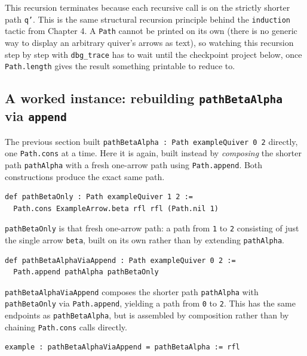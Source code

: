 This recursion terminates because each recursive call is on the strictly shorter path \texttt{q'}. This is the same structural recursion principle behind the \texttt{induction} tactic from Chapter 4. A \texttt{Path} cannot be printed on its own (there is no generic way to display an arbitrary quiver's arrows as text), so watching this recursion step by step with \texttt{dbg\_\allowbreak{}trace} has to wait until the checkpoint project below, once \texttt{Path.length} gives the result something printable to reduce to.

\subsection{\texorpdfstring{A worked instance: rebuilding \texttt{pathBetaAlpha} via \texttt{append}}{A worked instance: rebuilding pathBetaAlpha via append}}\label{sec:11-path-algebras:05-path-composition:3}

The previous section built \texttt{pathBetaAlpha : Path exampleQuiver 0 2} directly, one \texttt{Path.cons} at a time. Here it is again, built instead by \emph{composing} the shorter path \texttt{pathAlpha} with a fresh one-arrow path using \texttt{Path.append}. Both constructions produce the exact same path.

\begin{lstlisting}
def pathBetaOnly : Path exampleQuiver 1 2 :=
  Path.cons ExampleArrow.beta rfl rfl (Path.nil 1)
\end{lstlisting}

\texttt{pathBetaOnly} is that fresh one-arrow path: a path from \texttt{1} to \texttt{2} consisting of just the single arrow \texttt{beta}, built on its own rather than by extending \texttt{pathAlpha}.

\begin{lstlisting}
def pathBetaAlphaViaAppend : Path exampleQuiver 0 2 :=
  Path.append pathAlpha pathBetaOnly
\end{lstlisting}

\texttt{pathBetaAlphaViaAppend} composes the shorter path \texttt{pathAlpha} with \texttt{pathBetaOnly} via \texttt{Path.append}, yielding a path from \texttt{0} to \texttt{2}. This has the same endpoints as \texttt{pathBetaAlpha}, but is assembled by composition rather than by chaining \texttt{Path.cons} calls directly.

\begin{lstlisting}
example : pathBetaAlphaViaAppend = pathBetaAlpha := rfl
\end{lstlisting}

